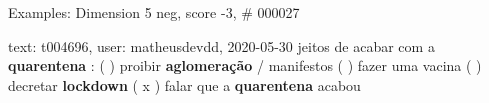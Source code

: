 \begin{frame}{Examples: Dimension 5 neg, score -3, \# 000027}
\footnotesize
\begin{alertblock}{text: t004696, user: matheusdevdd, 2020-05-30}
jeitos de acabar com a \textbf{quarentena} : ( ) proibir \textbf{aglomeração} / 
manifestos ( ) fazer uma vacina ( ) decretar \textbf{lockdown} ( x ) falar que 
a \textbf{quarentena} acabou 
\end{alertblock}
\end{frame}
